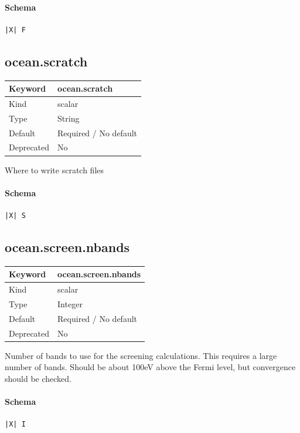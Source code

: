 \documentclass[11pt]{article}
\begin{document}
{{{{{\paragraph{Schema}
\begin{Verbatim}
|X| F
\end{Verbatim}

\subsection{ocean.scratch}
\label{kw:ocean-scratch}
\begin{longtable}{|p{1.5in}|p{4.5in}|}
\hline
Keyword & ocean.scratch \\
\hline
Kind & scalar \\
\hline
Type & String \\
\hline
Default & Required / No default \\
\hline
Deprecated & No \\
\hline
\end{longtable}
 Where to write scratch files

\paragraph{Schema}
\begin{Verbatim}
|X| S
\end{Verbatim}

\subsection{ocean.screen.nbands}
\label{kw:ocean-screen-nbands}
\begin{longtable}{|p{1.5in}|p{4.5in}|}
\hline
Keyword & ocean.screen.nbands \\
\hline
Kind & scalar \\
\hline
Type & Integer \\
\hline
Default & Required / No default \\
\hline
Deprecated & No \\
\hline
\end{longtable}
 Number of bands to use for the screening calculations. This requires a large
 number of bands. Should be about 100eV above the Fermi level, but convergence
 should be checked.

\paragraph{Schema}
\begin{Verbatim}
|X| I
\end{Verbatim}

}}}}}
\end{document}

